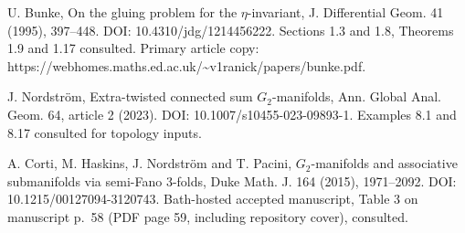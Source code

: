 \documentclass[10pt]{article}
\begin{document}
U. Bunke, On the gluing problem for the \(\eta\)-invariant, J. Differential Geom. 41 (1995), 397–448. DOI: 10.4310/jdg/1214456222. Sections 1.3 and 1.8, Theorems 1.9 and 1.17 consulted. Primary article copy: https://webhomes.maths.ed.ac.uk/\textasciitilde{}v1ranick/papers/bunke.pdf.\par
J. Nordström, Extra-twisted connected sum \(G_2\)-manifolds, Ann. Global Anal. Geom. 64, article 2 (2023). DOI: 10.1007/s10455-023-09893-1. Examples 8.1 and 8.17 consulted for topology inputs.\par
A. Corti, M. Haskins, J. Nordström and T. Pacini, \(G_2\)-manifolds and associative submanifolds via semi-Fano 3-folds, Duke Math. J. 164 (2015), 1971–2092. DOI: 10.1215/00127094-3120743. Bath-hosted accepted manuscript, Table 3 on manuscript p. 58 (PDF page 59, including repository cover), consulted.\par
\end{document}
